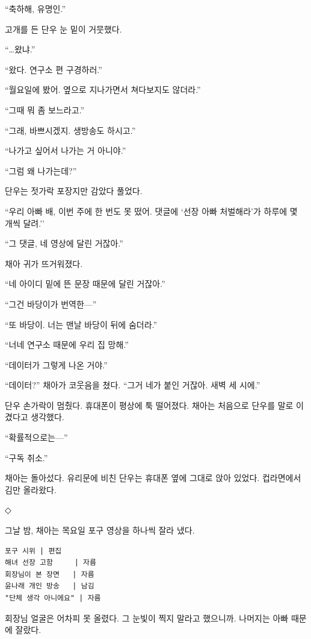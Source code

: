 \documentclass[
  korean,
  letterpaper,
  twoside,
  open=any,
  fontsize=12.5pt,
  headings=small]{scrbook}
\newcommand{\logfont}{\linespread{1}\fontsize{10.8}{15.2}\selectfont}
\begin{document}
``축하해, 유명인.''

고개를 든 단우 눈 밑이
거뭇했다.

``\ldots 왔냐.''

``왔다. 연구소 편 구경하러.''

``월요일에 봤어. 옆으로
지나가면서 쳐다보지도
않더라.''

``그때 뭐 좀 보느라고.''

``그래, 바쁘시겠지. 생방송도
하시고.''

``나가고 싶어서 나가는 거
아니야.''

``그럼 왜 나가는데?''

단우는 젓가락 포장지만 감았다
풀었다.

``우리 아빠 배, 이번 주에 한
번도 못 떴어. 댓글에 `선장
아빠 처벌해라'가 하루에 몇
개씩 달려.''

``그 댓글, 네 영상에 달린
거잖아.''

채아 귀가 뜨거워졌다.

``네 아이디 밑에 뜬 문장
때문에 달린 거잖아.''

``그건 바당이가 번역한---''

``또 바당이. 너는 맨날 바당이
뒤에 숨더라.''

``너네 연구소 때문에 우리 집
망해.''

``데이터가 그렇게 나온 거야.''

``데이터?'' 채아가 코웃음을
쳤다. ``그거 네가 붙인 거잖아.
새벽 세 시에.''

단우 손가락이 멈췄다. 휴대폰이
평상에 툭 떨어졌다. 채아는
처음으로 단우를 말로 이겼다고
생각했다.

``확률적으로는---''

``구독 취소.''

채아는 돌아섰다. 유리문에 비친
단우는 휴대폰 옆에 그대로 앉아
있었다. 컵라면에서 김만
올라왔다.

\begin{center}◇\end{center}\nopagebreak

그날 밤, 채아는 목요일 포구
영상을 하나씩 잘라 냈다.

\begin{Verbatim}[samepage=true,frame=single,framesep=2.5mm,rulecolor=\color{gray},formatcom=\logfont]
포구 시위 | 편집
해녀 선장 고함     | 자름
회장님이 본 장면   | 자름
윤나래 개인 방송   | 남김
"단체 생각 아니에요" | 자름
\end{Verbatim}

회장님 얼굴은 어차피 못
올렸다. 그 눈빛이 찍지 말라고
했으니까. 나머지는 아빠 때문에
잘랐다.
\end{document}

